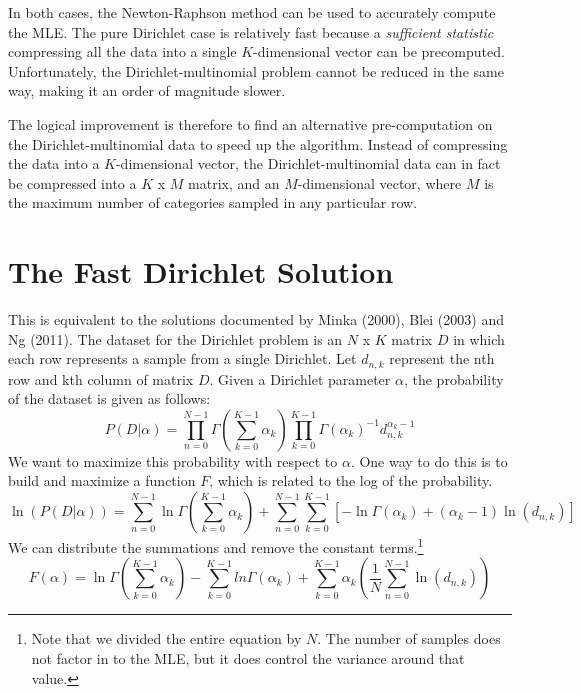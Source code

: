 \documentclass[twoside]{article}
\begin{document}
In both cases, the Newton-Raphson method can be used to accurately compute the MLE\cite{minka}.  The pure Dirichlet case is relatively fast because a \textit{sufficient statistic} compressing all the data into a single \(K\)-dimensional vector can be precomputed.  Unfortunately, the Dirichlet-multinomial problem cannot be reduced in the same way, making it an order of magnitude slower.

The logical improvement is therefore to find an alternative pre-computation on the Dirichlet-multinomial data to speed up the algorithm.  Instead of compressing the data into a \(K\)-dimensional vector, the Dirichlet-multinomial data can in fact be compressed into a \(K\) x \(M\) matrix, and an \(M\)-dimensional vector, where \(M\) is the maximum number of categories sampled in any particular row.

\section{The Fast Dirichlet Solution}
\label{fastdirichlet}

This is equivalent to the solutions documented by Minka\cite{minka} (2000), Blei\cite[A.4.2]{blei} (2003) and Ng\cite[pg 72-73]{ng} (2011).  The dataset for the Dirichlet problem is an \(N\) x \(K\) matrix $D$ in which each row represents a sample from a single Dirichlet.  Let $d_{n,k}$ represent the nth row and kth column of matrix $D$.  Given a Dirichlet parameter $\alpha$, the probability of the dataset is given as follows:
\[
P(D|\alpha)=\prod_{n=0}^{N-1}\Gamma\left(\sum_{k=0}^{K-1}\alpha_k\right)\prod_{k=0}^{K-1}\Gamma(\alpha_k)^{-1}d_{n,k}^{\alpha_k-1}
\]
We want to maximize this probability with respect to $\alpha$.  One way to do this is to build and maximize a function $F$, which is related to the log of the probability.
\begin{equation}
\ln(P(D|\alpha))=\sum_{n=0}^{N-1}\ln\Gamma\left(\sum_{k=0}^{K-1}\alpha_k\right) + \sum_{n=0}^{N-1}\sum_{k=0}^{K-1}\left[-\ln\Gamma(\alpha_k) + (\alpha_k-1)\ln\left(d_{n,k}\right)\right]
\end{equation}
We can distribute the summations and remove the constant terms.\footnote{Note that we divided the entire equation by $N$.  The number of samples does not factor in to the MLE, but it does control the variance around that value.}
\begin{equation} \label{eq:dirichf}
F(\alpha)=\ln\Gamma\left(\sum_{k=0}^{K-1}\alpha_k\right) - \sum_{k=0}^{K-1}ln\Gamma(\alpha_k) + \sum_{k=0}^{K-1}\alpha_k\left(\frac{1}{N}\sum_{n=0}^{N-1}\ln\left(d_{n,k}\right)\right)
\end{equation}
\end{document}
